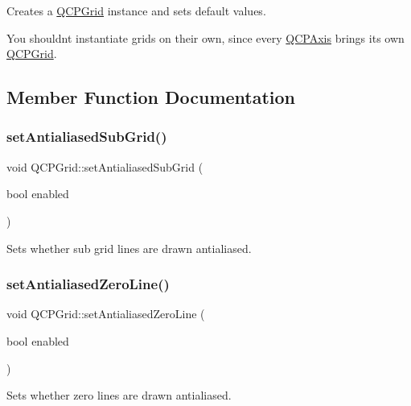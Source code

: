 Creates a \hyperlink{classQCPGrid}{Q\+C\+P\+Grid} instance and sets default values.

You shouldn\textquotesingle{}t instantiate grids on their own, since every \hyperlink{classQCPAxis}{Q\+C\+P\+Axis} brings its own \hyperlink{classQCPGrid}{Q\+C\+P\+Grid}. 

\subsection{Member Function Documentation}
\mbox{\label{classQCPGrid_a5692310ba183721a413d60951407d114}} 
\subsubsection{\texorpdfstring{set\+Antialiased\+Sub\+Grid()}{setAntialiasedSubGrid()}}
{\footnotesize\ttfamily void Q\+C\+P\+Grid\+::set\+Antialiased\+Sub\+Grid (\begin{DoxyParamCaption}\item[{bool}]{enabled }\end{DoxyParamCaption})}

Sets whether sub grid lines are drawn antialiased. \mbox{\label{classQCPGrid_a3cc6d54647393ee71afb6da56af07aa4}} 
\subsubsection{\texorpdfstring{set\+Antialiased\+Zero\+Line()}{setAntialiasedZeroLine()}}
{\footnotesize\ttfamily void Q\+C\+P\+Grid\+::set\+Antialiased\+Zero\+Line (\begin{DoxyParamCaption}\item[{bool}]{enabled }\end{DoxyParamCaption})}

Sets whether zero lines are drawn antialiased. \mbox{\label{classQCPGrid_aa05ab9816ffb440908171e45e833b593}} 
